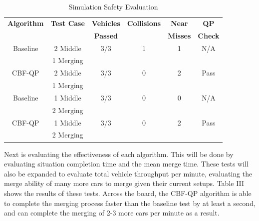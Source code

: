 \documentclass[conference]{IEEEtran}
\begin{document}
\begin{table}[htbp]
\caption{Simulation Safety Evaluation}
\centering
\begin{tabular}{|c|c|c|c|c|c|}
\hline
\textbf{Algorithm} & \textbf{Test Case} & \textbf{Vehicles} & \textbf{Collisions} &\textbf{Near} & \textbf{QP} \\ 

\textbf{} & \textbf{} & \textbf{Passed} & \textbf{} & \textbf{Misses} & \textbf{Check} \\ 
\hline
Baseline & 2 Middle & 3/3 & 1 & 1 & N/A \\ 

 & 1 Merging & & & & \\
\hline
CBF-QP & 2 Middle & 3/3 & 0 & 2 & Pass \\ 

 & 1 Merging & & & & \\
\hline
Baseline & 1 Middle & 3/3 & 0 & 0 & N/A \\ 

 & 2 Merging & & & & \\
\hline
CBF-QP & 1 Middle & 3/3 & 0 & 2 & Pass \\ 

 & 2 Merging & & & & \\
\hline
\end{tabular}
\end{table}

Next is evaluating the effectiveness of each algorithm. This will be done by evaluating situation completion time and the mean merge time. These tests will also be expanded to evaluate total vehicle throughput per minute, evaluating the merge ability of many more cars to merge given their current setups. Table III shows the results of these tests. Across the board, the CBF-QP algorithm is able to complete the merging process faster than the baseline test by at least a second, and can complete the merging of 2-3 more cars per minute as a result.
\end{document}
